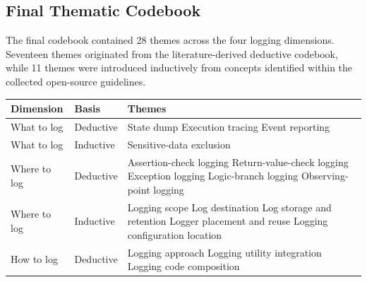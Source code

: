 \subsection{Final Thematic Codebook}

The final codebook contained 28 themes across the four logging dimensions. Seventeen
themes originated from the literature-derived deductive codebook, while 11 themes
were introduced inductively from concepts identified within the collected
open-source guidelines.

\begin{table}[H]
    \centering

    \begin{tabularx}{\textwidth}{p{2.7cm} p{2.0cm} X}
        \toprule

        \textbf{Dimension} &
        \textbf{Basis} &
        \textbf{Themes} \\

        \midrule

        What to log &
        Deductive &
        State dump \newline
        Execution tracing \newline
        Event reporting \\

        What to log &
        Inductive &
        Sensitive-data exclusion \\

        Where to log &
        Deductive &
        Assertion-check logging \newline
        Return-value-check logging \newline
        Exception logging \newline
        Logic-branch logging \newline
        Observing-point logging \\

        Where to log &
        Inductive &
        Logging scope \newline
        Log destination \newline
        Log storage and retention \newline
        Logger placement and reuse \newline
        Logging configuration location \\

        How to log &
        Deductive &
        Logging approach \newline
        Logging utility integration \newline
        Logging code composition \\


\end{tabularx}
\end{table}
